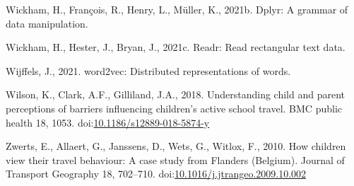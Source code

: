 \documentclass[]{elsarticle} %
\newlength{\cslhangindent}
\newlength{\cslentryspacingunit} %
\newenvironment{CSLReferences}[2] %
 {%
  \setlength{\parindent}{0pt}
  \ifodd #1
  \let\oldpar\par
  \def\par{\hangindent=\cslhangindent\oldpar}
  \fi
  \setlength{\parskip}{#2\cslentryspacingunit}
 }%
 {}
\begin{document}
\begin{CSLReferences}{1}{0}
\leavevmode{}%
Wickham, H., François, R., Henry, L., Müller, K., 2021b. Dplyr: A
grammar of data manipulation.

\leavevmode{}%
Wickham, H., Hester, J., Bryan, J., 2021c. Readr: Read rectangular text
data.

\leavevmode{}%
Wijffels, J., 2021. word2vec: Distributed representations of words.

\leavevmode{}%
Wilson, K., Clark, A.F., Gilliland, J.A., 2018. Understanding child and
parent perceptions of barriers influencing children's active school
travel. BMC public health 18, 1053.
doi:\href{https://doi.org/10.1186/s12889-018-5874-y}{10.1186/s12889-018-5874-y}

\leavevmode{}%
Zwerts, E., Allaert, G., Janssens, D., Wets, G., Witlox, F., 2010. How
children view their travel behaviour: A case study from {Flanders}
({Belgium}). Journal of Transport Geography 18, 702--710.
doi:\href{https://doi.org/10.1016/j.jtrangeo.2009.10.002}{10.1016/j.jtrangeo.2009.10.002}

\end{CSLReferences}
\end{document}
